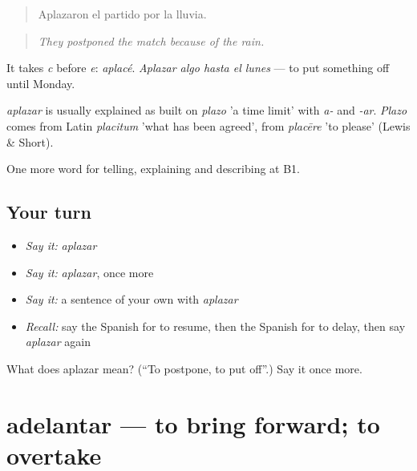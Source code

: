 \begin{quote}
Aplazaron el partido por la lluvia.
\end{quote}

\begin{quote}
\emph{They postponed the match because of the rain.}
\end{quote}

It takes \emph{c} before \emph{e}: \emph{aplacé}. \emph{Aplazar algo hasta el lunes} — to put something off until Monday.

\begin{cousinweb}
\emph{aplazar} is usually explained as built on \emph{plazo} 'a time limit' with \emph{a-} and \emph{-ar}. \emph{Plazo} comes from Latin \emph{placitum} 'what has been agreed', from \emph{placēre} 'to please' (Lewis \& Short).
\end{cousinweb}

\begin{grammarlens}[title={What you've built}]
One more word for telling, explaining and describing at B1.
\end{grammarlens}

\subsection*{Your turn}
\begin{itemize}
\raggedright
  \item \emph{Say it:} \emph{aplazar}
  \item \emph{Say it:} \emph{aplazar}, once more
  \item \emph{Say it:} a sentence of your own with \emph{aplazar}
  \item \emph{Recall:} say the Spanish for to resume, then the Spanish for to delay, then say \emph{aplazar} again
\end{itemize}

\begin{tcolorbox}[breakable,colback=teal!4,colframe=teal!35!black,title={Before you move on}]
What does aplazar mean? (\textquotedblleft{}To postpone, to put off\textquotedblright{}.) Say it once more.
\end{tcolorbox}
\section[adelantar]{adelantar — to bring forward; to overtake}

\label{lesson:ES-C543-adelantar}



